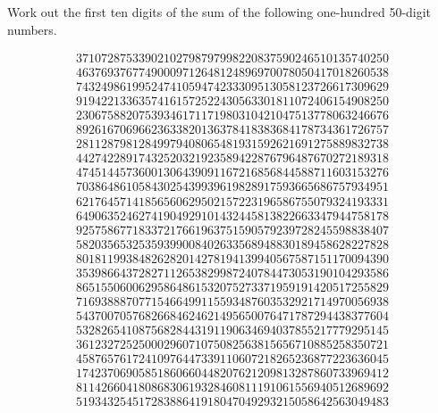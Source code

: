 \begin{ProjectEuler}{13}
%
Work out the first ten digits of the sum of the following one-hundred 50-digit numbers.
%
\begin{multicols}{2}
\begingroup\makeatletter\tiny
\begin{align*}
	37107287533902102798797998220837590246510135740250 \\
	46376937677490009712648124896970078050417018260538 \\
	74324986199524741059474233309513058123726617309629 \\
	91942213363574161572522430563301811072406154908250 \\
	23067588207539346171171980310421047513778063246676 \\
	89261670696623633820136378418383684178734361726757 \\
	28112879812849979408065481931592621691275889832738 \\
	44274228917432520321923589422876796487670272189318 \\
	47451445736001306439091167216856844588711603153276 \\
	70386486105843025439939619828917593665686757934951 \\
	62176457141856560629502157223196586755079324193331 \\
	64906352462741904929101432445813822663347944758178 \\
	92575867718337217661963751590579239728245598838407 \\
	58203565325359399008402633568948830189458628227828 \\
	80181199384826282014278194139940567587151170094390 \\
	35398664372827112653829987240784473053190104293586 \\
	86515506006295864861532075273371959191420517255829 \\
	71693888707715466499115593487603532921714970056938 \\
	54370070576826684624621495650076471787294438377604 \\
	53282654108756828443191190634694037855217779295145 \\
	36123272525000296071075082563815656710885258350721 \\
	45876576172410976447339110607218265236877223636045 \\
	17423706905851860660448207621209813287860733969412 \\
	81142660418086830619328460811191061556940512689692 \\
	51934325451728388641918047049293215058642563049483 \\

\end{align*}
\end{multicols}
\end{ProjectEuler}
